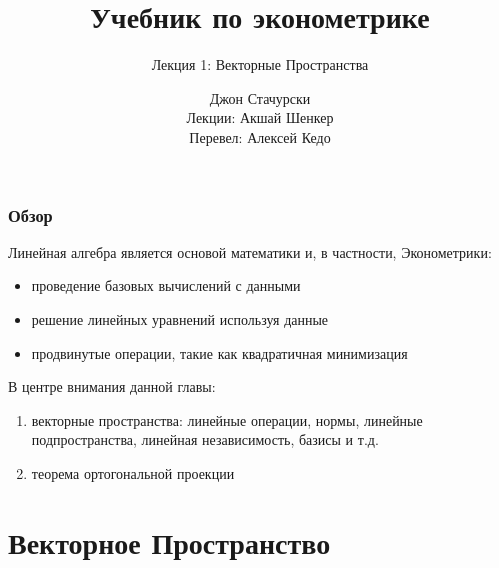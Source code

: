 



\title{Учебник по эконометрике}

\subtitle
{Лекция 1: Векторные Пространства}


\author{Джон Стачурски \\ \vspace{0.5em} 
	\scriptsize Лекции: Акшай Шенкер \\ \vspace{0.1em} 
	\scriptsize Перевел: Алексей Кедо}



\begin{frame}
  \titlepage
\end{frame}


\begin{frame}

    \frametitle{Обзор}

    \vspace{2em}
    Линейная алгебра является основой математики и, в частности, Эконометрики: 
    
    \begin{itemize}
        \item проведение базовых вычислений с данными 
        \item решение линейных уравнений используя данные
        \item продвинутые операции, такие как квадратичная минимизация 
    \end{itemize}
    
    \vspace{1em}
    В центре внимания данной главы:
    \begin{enumerate}
        \item векторные пространства: линейные операции, нормы, линейные подпространства, 
        линейная независимость, базисы и т.д. 
        \item теорема ортогональной проекции 
    \end{enumerate}
 
\end{frame}

\section{Векторное Пространство}

